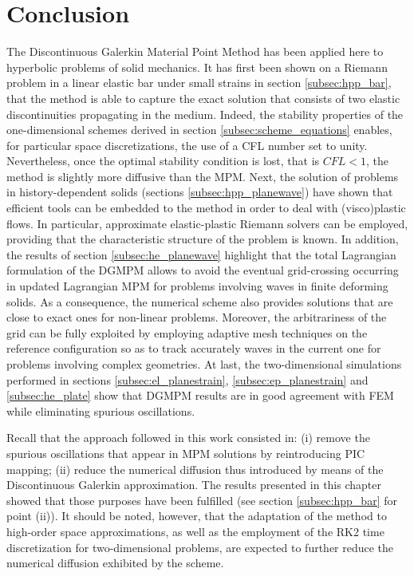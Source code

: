 \section{Conclusion}
The Discontinuous Galerkin Material Point Method has been applied here to hyperbolic problems of solid mechanics.
It has first been shown on a Riemann problem in a linear elastic bar under small strains in section \ref{subsec:hpp_bar}, that the method is able to capture the exact solution that consists of two elastic discontinuities propagating in the medium.
Indeed, the stability properties of the one-dimensional schemes derived in section \ref{subsec:scheme_equations} enables, for particular space discretizations, the use of a CFL number set to unity.
Nevertheless, once the optimal stability condition is lost, that is $CFL <1$, the method is slightly more diffusive than the MPM.
Next, the solution of problems in history-dependent solids (sections \ref{subsec:hpp_planewave}) have shown that efficient tools can be embedded to the method in order to deal with (visco)plastic flows. 
In particular, approximate elastic-plastic Riemann solvers can be employed, providing that the characteristic structure of the problem is known.
In addition, the results of section \ref{subsec:he_planewave} highlight that the total Lagrangian formulation of the DGMPM allows to avoid the eventual grid-crossing occurring in updated Lagrangian MPM for problems involving waves in finite deforming solids.
As a consequence, the numerical scheme also provides solutions that are close to exact ones for non-linear problems.
Moreover, the arbitrariness of the grid can be fully exploited by employing adaptive mesh techniques on the reference configuration so as to track accurately waves in the current one for problems involving complex geometries.
At last, the two-dimensional simulations performed in sections \ref{subsec:el_planestrain}, \ref{subsec:ep_planestrain} and \ref{subsec:he_plate} show that DGMPM results are in good agreement with FEM while eliminating spurious oscillations.

Recall that the approach followed in this work consisted in: (i) remove the spurious oscillations that appear in MPM solutions by reintroducing PIC mapping; (ii) reduce the numerical diffusion thus introduced by means of the Discontinuous Galerkin approximation.
The results presented in this chapter showed that those purposes have been fulfilled (see section \ref{subsec:hpp_bar} for point (ii)).
It should be noted, however, that the adaptation of the method to high-order space approximations, as well as the employment of the RK2 time discretization for two-dimensional problems, are expected to further reduce the numerical diffusion exhibited by the scheme. 


